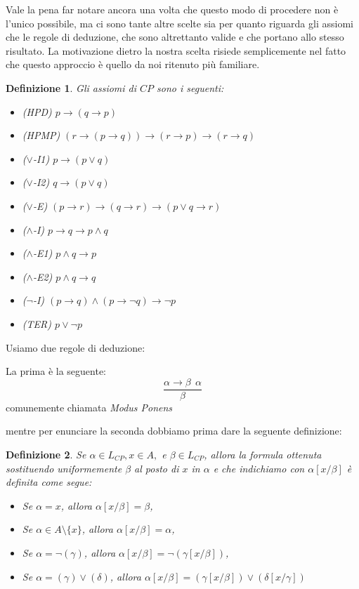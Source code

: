 \documentclass[a4paper, titlepage, 12pt]{report}
\newtheorem{definition}{Definizione}[chapter]
\begin{document}
Vale la pena far notare ancora una volta che questo modo di procedere non è l'unico
possibile, ma ci sono tante altre scelte sia
per quanto riguarda gli assiomi che le regole di deduzione, che sono altrettanto valide
e che portano allo stesso risultato. La motivazione dietro la nostra scelta
risiede semplicemente nel fatto che questo approccio è quello da noi ritenuto più familiare.

\begin{definition}
Gli assiomi di $CP$ sono i seguenti:
\begin{itemize}
\item (HPD) $p \rightarrow (q \rightarrow p)$
\item (HPMP) $(r \rightarrow (p \rightarrow q)) \rightarrow (r \rightarrow p) \rightarrow (r \rightarrow q)$
\item ($\lor$-I1) $p \rightarrow (p \lor q)$
\item ($\lor$-I2) $q \rightarrow (p \lor q)$
\item ($\lor$-E) $(p \rightarrow r) \rightarrow (q \rightarrow r) \rightarrow (p \lor q \rightarrow r)$
\item ($\land$-I) $p \rightarrow q \rightarrow p \land q$
\item ($\land$-E1) $p \land q \rightarrow p$
\item ($\land$-E2) $p \land q \rightarrow q$
\item ($\neg$-I) $(p \rightarrow q) \land (p \rightarrow \neg q) \rightarrow \neg p$
\item (TER) $p \lor \neg p$
\end{itemize}
\end{definition}

Usiamo due regole di deduzione:

La prima è la seguente:
$$\frac{\alpha \rightarrow \beta \ \ \alpha}{\beta}$$
comunemente chiamata \emph{Modus Ponens}

mentre per enunciare la seconda dobbiamo prima dare la seguente definizione:
\begin{definition}
Se $\alpha \in L_{CP}, x \in A,$ e $\beta \in L_{CP}$, allora la formula
ottenuta sostituendo uniformemente $\beta$ al posto di $x$ in $\alpha$
e che indichiamo con $\alpha[x/\beta]$ è definita come segue:
\begin{itemize}
\item Se $\alpha = x$, allora $\alpha[x/\beta] = \beta$,
\item Se $\alpha \in A \setminus \{x\}$, allora $\alpha[x/\beta] = \alpha$,
\item Se $\alpha = \neg (\gamma)$, allora $\alpha[x/\beta] = \neg (\gamma[x/\beta])$,
\item Se $\alpha = (\gamma) \lor (\delta)$,
      allora $\alpha[x/\beta] = (\gamma[x/\beta]) \lor (\delta[x/\gamma])$
\end{itemize}
\end{definition}
\end{document}
